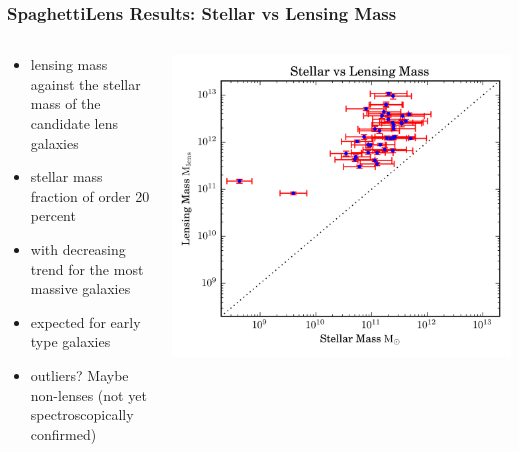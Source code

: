 \documentclass[aspectratio=1610]{beamer}
\begin{document}
 \begin{frame}
   \frametitle{SpaghettiLens Results: Stellar vs Lensing Mass}

   \begin{columns}[c]
   \begin{column}{0.5\textwidth}
     \begin{itemize}
       \item lensing mass against the stellar mass of the candidate lens galaxies
       \item stellar mass fraction of order 20 percent
       \item with decreasing trend for the most massive galaxies
       \item expected for early type galaxies
       \item outliers? Maybe non-lenses (not yet spectroscopically confirmed)
     \end{itemize}
 
   \end{column}\begin{column}{0.5\textwidth}
     \includegraphics[width=\textwidth]{imgs/plot}
   \end{column}
   \end{columns}

 \end{frame}
\end{document}
